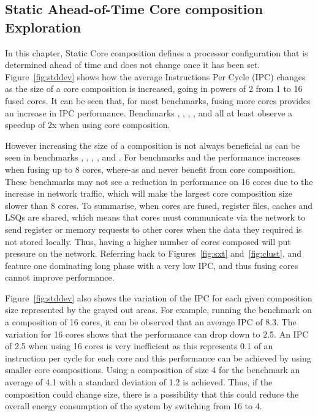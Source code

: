 \subsection{Static Ahead-of-Time Core composition Exploration}

In this chapter, Static Core composition defines a processor configuration that is determined ahead of time and does not change once it has been set.
Figure~\ref{fig:stddev} shows how the average Instructions Per Cycle (IPC) changes as the size of a core composition is increased, going in powers of 2 from 1 to 16 fused cores.
It can be seen that, for most benchmarks, fusing more cores provides an increase in IPC performance.
Benchmarks , , , ,  and  all at least observe a speedup of 2x when using core composition.

However increasing the size of a composition is not always beneficial as can be seen in benchmarks , , , , and .
For benchmarks  and  the performance increases when fusing up to 8 cores, where-as  and  never benefit from core composition.
These benchmarks may not see a reduction in performance on 16 cores due to the increase in network traffic, which will make the largest core composition size slower than 8 cores.
To summarise, when cores are fused, register files, caches and LSQs are shared, which means that cores must communicate via the network to send register or memory requests to other cores when the data they required is not stored locally.
Thus, having a higher number of cores composed will put pressure on the network.
Referring back to Figures~\ref{fig:sxt} and~\ref{fig:clust},  and  feature one dominating long phase with a very low IPC, and thus fusing cores cannot improve performance.

Figure~\ref{fig:stddev} also shows the variation of the IPC for each given composition size represented by the grayed out areas.
For example, running the  benchmark on a composition of 16 cores, it can be observed that an average IPC of 8.3.
The variation for 16 cores shows that the performance can drop down to 2.5.
An IPC of 2.5 when using 16 cores is very inefficient as this represents 0.1 of an instruction per cycle for each core and this performance can be achieved by using smaller core compositions.
Using a composition of size 4 for the  benchmark an average of 4.1 with a standard deviation of 1.2 is achieved.
Thus, if the composition could change size, there is a possibility that this could reduce the overall energy consumption of the system by switching from 16 to 4.

